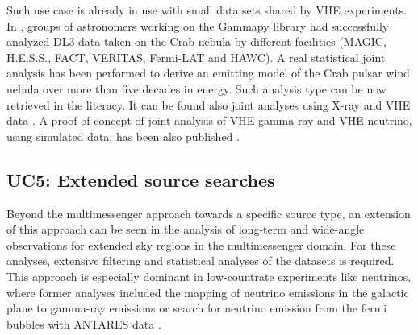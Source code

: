 \documentclass[11pt,a4paper]{ivoa}
\begin{document}
Such use case is already in use with small data sets shared by VHE experiments. In
\citep{2019A&A...625A..10N, 2022A&A...667A..36A}, groups of astronomers working on the Gammapy library had successfully
analyzed DL3 data taken on the Crab nebula by different facilities (MAGIC, H.E.S.S., FACT, VERITAS, Fermi-LAT and HAWC).
A real statistical joint analysis has been performed to derive an emitting model of the Crab pulsar wind nebula over more
than five decades in energy. Such analysis type can be now retrieved in the literacy. It can be found also joint analyses
using X-ray and VHE data \citep{giunti2022}. A proof of concept of joint analysis of VHE gamma-ray and VHE neutrino,
using simulated data, has been also published \citep{unbehaun2024}.

\subsection{UC5: Extended source searches}

Beyond the multimessenger approach towards a specific source type, an extension of this approach can be seen in the analysis
of long-term and wide-angle observations for extended sky regions in the multimessenger domain. For these analyses, extensive filtering
and statistical analyses of the datasets is required. This approach is especially dominant in low-countrate experiments like neutrinos,
where former analyses included the mapping of neutrino emissions in the galactic plane to gamma-ray emissions \citep{doi:10.1126/science.adc9818}
or search for neutrino emission from the fermi bubbles with ANTARES data \citep{ANTARES2014}.
\end{document}

